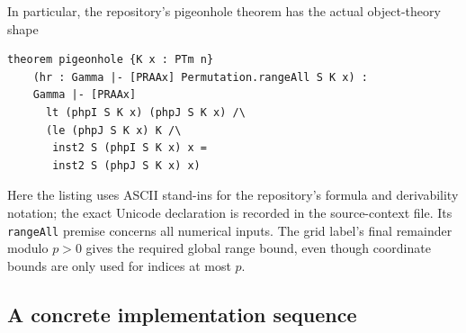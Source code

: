 \documentclass[11pt,letterpaper]{article}
\theoremstyle{definition}
\theoremstyle{remark}
\begin{document}
In particular, the repository's pigeonhole theorem has the actual
object-theory shape
\begin{lstlisting}
theorem pigeonhole {K x : PTm n}
    (hr : Gamma |- [PRAAx] Permutation.rangeAll S K x) :
    Gamma |- [PRAAx]
      lt (phpI S K x) (phpJ S K x) /\
      (le (phpJ S K x) K /\
       inst2 S (phpI S K x) x =
       inst2 S (phpJ S K x) x)
\end{lstlisting}
Here the listing uses ASCII stand-ins for the repository's formula and
derivability notation; the exact Unicode declaration is recorded in the
source-context file. Its \texttt{rangeAll} premise concerns all numerical
inputs. The grid label's final remainder modulo \(p>0\) gives the required
global range bound, even though coordinate bounds are only used for
indices at most \(p\).

\subsection{A concrete implementation sequence}
\end{document}
